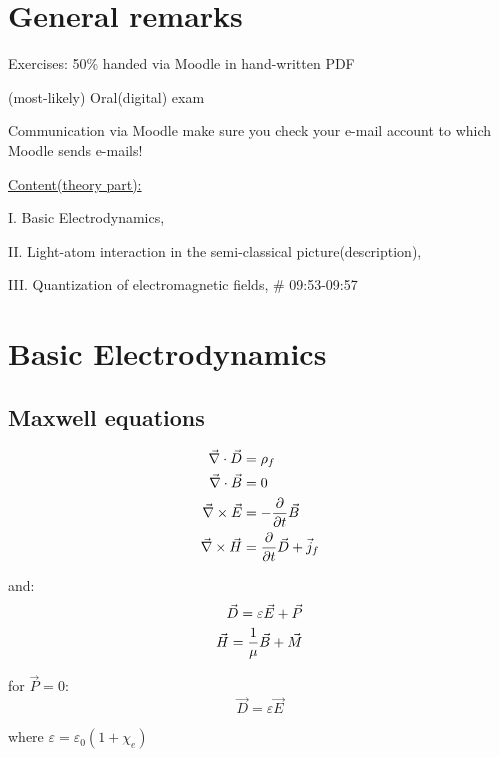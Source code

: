 


    \setcounter{section}{-1}
    \section{General remarks}
        Exercises: 50\% handed via Moodle in hand-written PDF

        (most-likely) Oral(digital) exam

        Communication via Moodle make sure you check your e-mail account to which Moodle sends e-mails!

        \underline{Content(theory part):}

        I. Basic Electrodynamics,

        II. Light-atom interaction in the semi-classical picture(description),

        III. Quantization of electromagnetic fields,
        \# 09:53-09:57

    \section{Basic Electrodynamics}
    \setcounter{subsection}{-1}
        \subsection{Maxwell equations}

            $$
            \begin{aligned}
                \vec{\nabla} \cdot \vec{D} &= \rho_f \nonumber \\ 
                \vec{\nabla} \cdot \vec{B} &= 0 \nonumber \\ 
                \vec{\nabla} \times \vec{E} &= - \frac{\partial}{\partial t} \vec{B} \nonumber \\ 
                \vec{\nabla} \times \vec{H} &= \frac{\partial}{\partial t} \vec{D} + \vec{j}_f \nonumber \\ 
            \end{aligned}
            $$

            and:
            $$
            \begin{aligned}
                \vec{D} = \varepsilon \vec{E} + \vec{P} \nonumber \\ 
                \vec{H} = \frac{1}{\mu} \vec{B} + \vec{M} \nonumber \\ 
            \end{aligned}
            $$

            for $\vec{P} = 0$:
            $$
            \vec{D} = \varepsilon \vec{E}
            $$

            where $\varepsilon = \varepsilon_0\left(1+\chi_e\right)$

